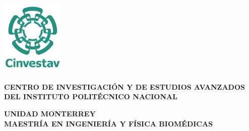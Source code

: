 %


\begin{titlepage}
	\tgherosfont
	\centering
	
	\noindent
	\hspace{-3cm}
	\begin{minipage}[h]{0.2\textwidth}
		\hspace{-10mm} %
		\includegraphics[width=3cm]{gfx/logospng1.png}
	\end{minipage}%
	\begin{minipage}[h]{0.8\textwidth}
		\centering
		\Large 
		\textbf{CENTRO DE INVESTIGACIÓN Y DE ESTUDIOS AVANZADOS DEL INSTITUTO POLITÉCNICO NACIONAL}
	\end{minipage}


	{\Large \textbf{UNIDAD MONTERREY}} \\[4mm]
	{\Large \textbf{MAESTRÍA EN INGENIERÍA Y FÍSICA BIOMÉDICAS}} \\[10mm]
	



\end{titlepage}
